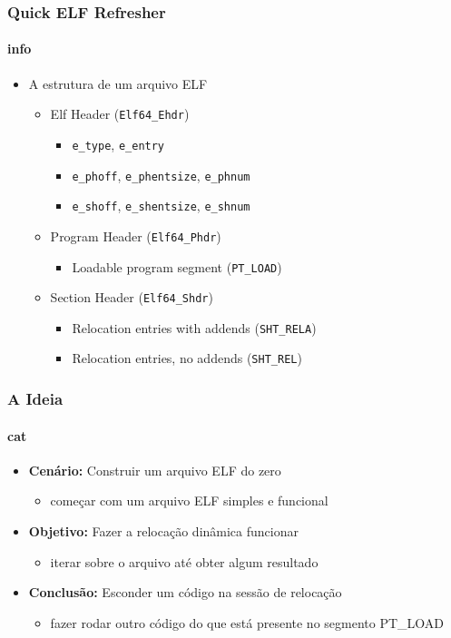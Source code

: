 \documentclass[portuguese]{beamer}
\begin{document}
\begin{frame}
	\frametitle{Quick ELF Refresher}
	\framesubtitle{info}
	\begin{itemize}
		\item A estrutura de um arquivo ELF\cite{elf.h}
		\begin{itemize}
			\item Elf Header (\texttt{Elf64\_Ehdr})
			\begin{itemize}
				\item \texttt{e\_type}, \texttt{e\_entry}
				\item \texttt{e\_phoff}, \texttt{e\_phentsize}, \texttt{e\_phnum}
				\item \texttt{e\_shoff}, \texttt{e\_shentsize}, \texttt{e\_shnum}
			\end{itemize}
			\item Program Header (\texttt{Elf64\_Phdr})
			\begin{itemize}
				\item Loadable program segment (\texttt{PT\_LOAD})
			\end{itemize}
			\item Section Header (\texttt{Elf64\_Shdr})
			\begin{itemize}
				\item Relocation entries with addends (\texttt{SHT\_RELA})
				\item Relocation entries, no addends (\texttt{SHT\_REL})
			\end{itemize}
		\end{itemize}
	\end{itemize}
\end{frame}

\begin{frame}
	\frametitle{A Ideia}
	\framesubtitle{cat}
	\begin{itemize}
		\item \textbf{Cenário:} Construir um arquivo ELF do zero
		\begin{itemize}
			\item começar com um arquivo ELF simples e funcional
		\end{itemize}
		\item \textbf{Objetivo:} Fazer a relocação dinâmica funcionar
		\begin{itemize}
			\item iterar sobre o arquivo até obter algum resultado
		\end{itemize}
		\item \textbf{Conclusão:} Esconder um código na sessão de relocação
		\begin{itemize}
			\item fazer rodar outro código do que está presente no segmento PT\_LOAD
		\end{itemize}
	\end{itemize}
\end{frame}
\end{document}
